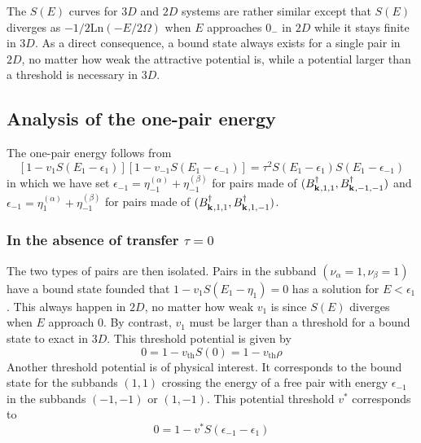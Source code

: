 \documentclass[11pt]{article} %
\begin{document}
The $S(E)$ curves for $3D$ and $2D$ systems are rather similar except that $S(E)$ diverges as $-1/2\text{Ln}(-E/2\Omega)$ when $E$ approaches $0_{-}$ in $2D$ while it stays finite in $3D$.  As a direct consequence, a bound state always exists for a single pair in $2D$, no matter how weak the attractive potential is, while a potential larger than a threshold is necessary in $3D$.

\subsection{Analysis of the one-pair energy}
The one-pair energy follows from 
\begin{equation}\label{eq:ssEq}
[1-v_{1}S(E_1-\epsilon_{1})][1-v_{-1}S(E_1-\epsilon_{-1})]
=\tau^2S(E_1-\epsilon_{1})S(E_1-\epsilon_{-1})
\end{equation}
in which we have set $\epsilon_{-1}=\eta_{-1}^{(\alpha)}+\eta_{-1}^{(\beta)}$ for pairs made of $(B^{\dagger}_{\mathbf{k}^{},1,1},B^{\dagger}_{\mathbf{k}^{},-1,-1})$ and $\epsilon_{-1}=\eta_{1}^{(\alpha)}+\eta_{-1}^{(\beta)}$ for pairs made of $(B^{\dagger}_{\mathbf{k}^{},1,1},B^{\dagger}_{\mathbf{k}^{},1,-1})$.

\subsubsection{In the absence of transfer $\tau=0$}
The two types of pairs are then {isolated}. Pairs in the subband $(\nu_{\alpha}=1,\nu_{\beta}=1)$ have a bound state founded that $1-v_{1}S(E_1-\eta_{1})=0$ has a solution for $E<\epsilon_{1}$.  This always happen in $2D$, no matter how weak $v_{1}$ is since $S(E)$ diverges when $E$ approach $0$. By contrast, $v_{1}$ must be larger than a threshold for a bound state to exact in $3D$.  This threshold potential is given by 
\begin{equation}
0=1-v_{\text{th}}S(0)=1-v_{\text{th}}\rho
\end{equation}
Another threshold potential is of physical interest. It corresponds to the bound state for the subbands $(1,1)$ crossing the energy of a free pair with energy $\epsilon_{-1}$ in the subbands $(-1,-1)$ or $(1,-1)$.  This potential threshold $v^{*}$ corresponds to
\begin{equation}
0=1-v^{*}S(\epsilon_{-1}-\epsilon_{1})
\end{equation}
\end{document}
